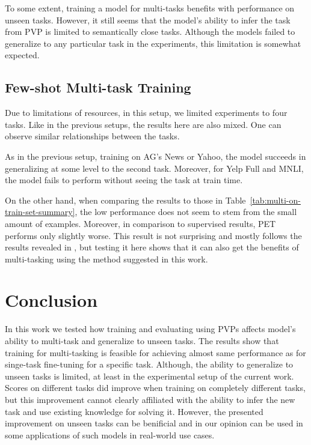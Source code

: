 \documentclass[11pt,a4paper]{article}
\begin{document}
To some extent, training a model for multi-tasks benefits with performance on unseen tasks.
However, it still seems that the model's ability to infer the task from PVP is limited to semantically close tasks.
Although the models failed to generalize to any particular task in the experiments, this limitation is somewhat expected.

\subsection{Few-shot Multi-task Training}
Due to limitations of resources, in this setup, we limited experiments to four tasks.
Like in the previous setups, the results here are also mixed.
One can observe similar relationships between the tasks.

As in the previous setup, training on AG's News or Yahoo, the model succeeds in generalizing at some level to the second task.
Moreover, for Yelp Full and MNLI, the model fails to perform without seeing the task at train time.

On the other hand, when comparing the results to those in Table~\ref{tab:multi-on-train-set-summary},
the low performance does not seem to stem from the small amount of examples.
Moreover, in comparison to supervised results, PET performs only slightly worse.
This result is not surprising and mostly follows the results revealed in \citet{schick2020exploiting}, but testing it here shows that it can also get the benefits of multi-tasking using the method suggested in this work.

\section{Conclusion}
In this work we tested how training and evaluating using PVPs affects model's ability to multi-task and generalize to unseen tasks.
The results show that training for multi-tasking is feasible for achieving almost same performance as for singe-task fine-tuning for a specific task.
Although, the ability to generalize to unseen tasks is limited, at least in the experimental setup of the current work.
Scores on different tasks did improve when training on completely different tasks, but this improvement cannot clearly affiliated with the ability to infer the new task and use existing knowledge for solving it. 
However, the presented improvement on unseen tasks can be benificial and in our opinion can be used in some applications of such models in real-world use cases. 
\end{document}
